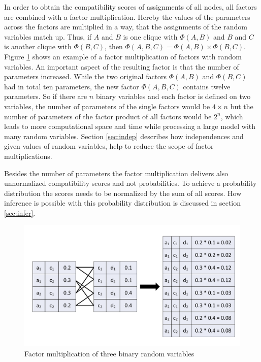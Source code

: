 In order to obtain the compatibility scores of assignments of all nodes, all factors are combined with a factor multiplication. Hereby the values of the parameters across the factors are multiplied in a way, that the assignments of the random variables match up. Thus, if $A$ and $B$ is one clique with $\Phi(A,B)$ and $B$ and $C$ is another clique with $\Phi(B,C)$, then $\Phi(A,B,C)=\Phi(A,B)\times\Phi(B,C)$. Figure \ref{fig:parammult} shows an example of a factor multiplication of factors with random variables. An important aspect of the resulting factor is that the number of parameters increased. While the two original factors $\Phi(A,B)$ and $\Phi(B,C)$ had in total ten parameters, the new factor $\Phi(A,B,C)$ contains twelve parameters. So if there are $n$ binary variables and each factor is defined on two variables, the number of parameters of the single factors would be $4\times n$ but the number of parameters of the factor product of all factors would be $2^n$, which leads to more computational space and time while processing a large model with many random variables. Section \ref{sec:indep} describes how independences and given values of random variables, help to reduce the scope of factor multiplications.

Besides the number of parameters the factor multiplication delivers also unnormalized compatibility scores and not probabilities. To achieve a probability distribution the scores needs to be normalized by the sum of all scores. How inference is possible with this probability distribution is discussed in section \ref{sec:infer}.


\begin{figure}[htpb]
  \centering
  	\includegraphics[scale=0.4]{img/parammult.pdf} 
  \caption{Factor multiplication of three binary random variables}
  \label{fig:parammult}
\end{figure}

